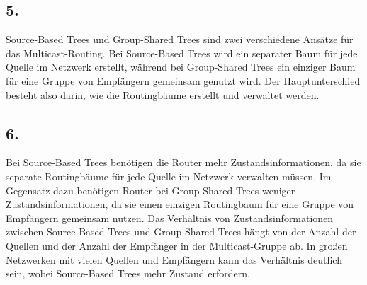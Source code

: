 \documentclass[a4paper]{scrartcl}
\begin{document}
\subsection*{5.}
Source-Based Trees und Group-Shared Trees sind zwei verschiedene Ansätze für das Multicast-Routing. Bei Source-Based Trees wird ein separater Baum für jede Quelle im Netzwerk erstellt, während bei Group-Shared Trees ein einziger Baum für eine Gruppe von Empfängern gemeinsam genutzt wird. Der Hauptunterschied besteht also darin, wie die Routingbäume erstellt und verwaltet werden.
\subsection*{6.}
Bei Source-Based Trees benötigen die Router mehr Zustandsinformationen, da sie separate Routingbäume für jede Quelle im Netzwerk verwalten müssen. Im Gegensatz dazu benötigen Router bei Group-Shared Trees weniger Zustandsinformationen, da sie einen einzigen Routingbaum für eine Gruppe von Empfängern gemeinsam nutzen. Das Verhältnis von Zustandsinformationen zwischen Source-Based Trees und Group-Shared Trees hängt von der Anzahl der Quellen und der Anzahl der Empfänger in der Multicast-Gruppe ab. In großen Netzwerken mit vielen Quellen und Empfängern kann das Verhältnis deutlich sein, wobei Source-Based Trees mehr Zustand erfordern.
\end{document}
